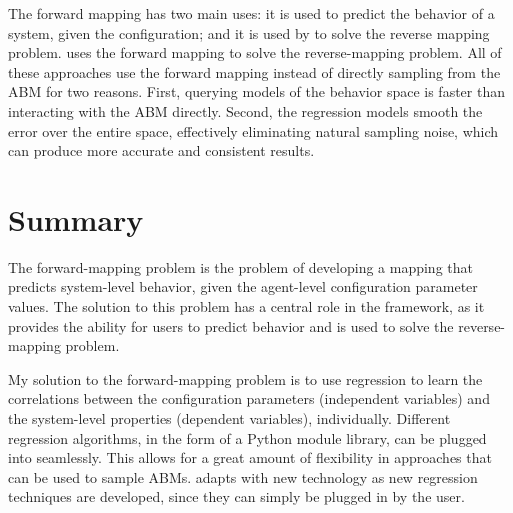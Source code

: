 The forward mapping has two main uses: it is used to predict the behavior of a system, given the configuration; and it is used by \fw to solve the reverse mapping problem.
\fw uses the forward mapping to solve the reverse-mapping problem.
All of these approaches use the forward mapping instead of directly sampling from the ABM for two reasons.
First, querying models of the behavior space is faster than interacting with the ABM directly.
Second, the regression models smooth the error over the entire space, effectively eliminating natural sampling noise, which can produce more accurate and consistent results.



\section{Summary}

The forward-mapping problem is the problem of developing a mapping that predicts system-level behavior, given the agent-level configuration parameter values.
The solution to this problem has a central role in the framework, as it provides the ability for users to predict behavior and is used to solve the reverse-mapping problem.

My solution to the forward-mapping problem is to use regression to learn the correlations between the configuration parameters (independent variables) and the system-level properties (dependent variables), individually.
Different regression algorithms, in the form of a Python module library, can be plugged into \fw seamlessly.
This allows for a great amount of flexibility in approaches that can be used to sample ABMs.
\fw adapts with new technology as new regression techniques are developed, since they can simply be plugged in by the user.








